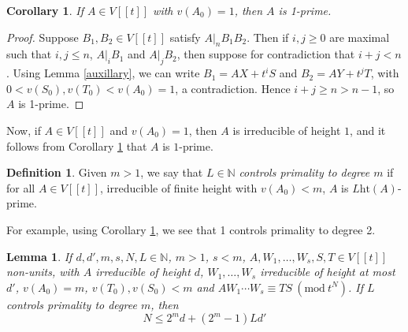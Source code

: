 \documentclass{article}
\newcommand{\Mod}[1]{\ (\mathrm{mod}\ #1)}
\theoremstyle{plain}
\newtheorem{lemma}[theorem]{Lemma}
\newtheorem{corollary}[theorem]{Corollary}
\theoremstyle{definition}
\newtheorem{definition}[theorem]{Definition}
\theoremstyle{remark}
\theoremstyle{plain}
\begin{document}
\begin{corollary}\label{valuation_one_case}
If $A\in V[[t]]$ with $v(A_0)=1$, then $A$ is 1-prime.
\end{corollary}

\begin{proof}

Suppose $B_1,B_2\in V[[t]]$ satisfy $A|_n B_1B_2$. Then if $i,j\geq 0$ are maximal such that $i,j\leq n$, $A|_iB_1$ and $A|_jB_2$,  then suppose for contradiction that $i+j<n$. Using Lemma \ref{auxillary}, we can write $B_1=AX+t^iS$ and $B_2=AY+t^jT$, with $0<v(S_0),v(T_0)<v(A_0)=1$, a contradiction.
Hence $i+j\geq n>n-1$, so $A$ is 1-prime.\end{proof}

\noindent Now, if $A\in V[[t]]$ and $v(A_0)=1$, then $A$ is irreducible of height $1$, and it follows from Corollary \ref{valuation_one_case} that $A$ is $1$-prime.

\begin{definition}
Given $m>1$, we say that $L\in\mathbb{N}$ \emph{controls primality to degree $m$} if for all $A\in V[[t]]$, irreducible of finite height with $v(A_0)<m$, $A$ is $L\text{ht}(A)$-prime.
\end{definition}

\noindent For example, using Corollary \ref{valuation_one_case}, we see that 1 controls primality to degree 2.


\begin{lemma}\label{extra}
If $d,d',m,s,N,L\in\mathbb{N}$, $m>1$, $s<m$, $A,W_1,\dots,W_s,S,T\in V[[t]]$ non-units, with $A$ irreducible of height $d$, $W_1,\dots,W_s$ irreducible of height at most $d'$, $v(A_0)=m$, $v(T_0),v(S_0)<m$ and $AW_1\cdots W_s\equiv TS\Mod{t^N}$. If $L$ controls primality to degree $m$, then $$N\leq 2^md+(2^m-1)Ld'$$
\end{lemma}
\end{document}
